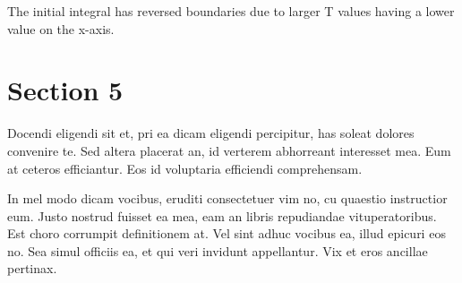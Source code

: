 The initial integral has reversed boundaries due to larger T values having a lower value on the x-axis.
  
  


\section{Section 5}\label{APPENDIXA_SECTION2}

Docendi eligendi sit et, pri ea dicam eligendi percipitur, has soleat
dolores convenire te. Sed altera placerat an, id verterem abhorreant
interesset mea. Eum at ceteros efficiantur. Eos id voluptaria efficiendi
comprehensam.

In mel modo dicam vocibus, eruditi consectetuer vim no, cu quaestio
instructior eum. Justo nostrud fuisset ea mea, eam an libris repudiandae
vituperatoribus. Est choro corrumpit definitionem at. Vel sint adhuc vocibus
ea, illud epicuri eos no. Sea simul officiis ea, et qui veri invidunt
appellantur. Vix et eros ancillae pertinax.
